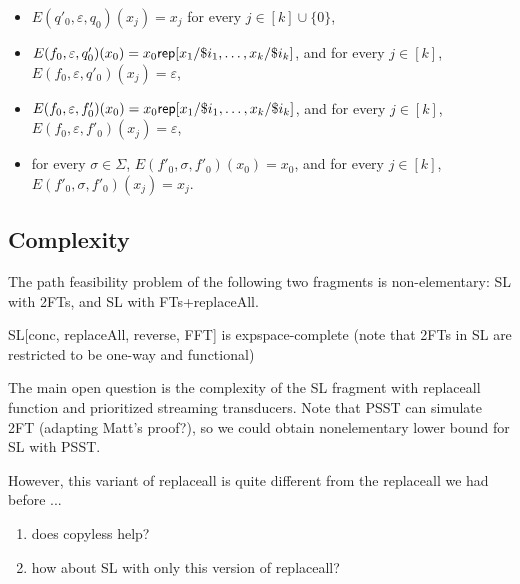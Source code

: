\begin{itemize}
\begin{itemize}
\item $E(q'_0, \varepsilon, q_0)(x_j) = x_j$ for every $j \in [k] \cup \{0\}$, 
%
\item $E(f_0, \varepsilon, q'_0)(x_0) = x_0 \mathsf{rep}[x_1/\$i_1,\ldots, x_k/\$i_k]$, and for every $j \in [k]$, $E(f_0, \varepsilon, q'_0)(x_j) = \varepsilon$, 
%
\item $E(f_0, \varepsilon, f'_0)(x_0) = x_0  \mathsf{rep}[x_1/\$i_1,\ldots, x_k/\$i_k]$, and for every $j \in [k]$, $E(f_0, \varepsilon, f'_0)(x_j) = \varepsilon$,
%
\item for every $\sigma \in \Sigma$, $E(f'_0, \sigma, f'_0)(x_0) = x_0$, and  for every $j \in [k]$, $E(f'_0, \sigma, f'_0)(x_j) = x_j$.
\end{itemize}
%
\end{itemize}


\subsection{Complexity}

\begin{proposition}[POPL'19]
	The path feasibility problem of the following two fragments is non-elementary: SL with 2FTs, and SL with FTs+replaceAll.
	
	SL[conc, replaceAll, reverse, FFT] is expspace-complete (note that 2FTs in SL are restricted to be one-way and functional)
\end{proposition}



The main open question is the complexity of the SL fragment with replaceall function and prioritized streaming transducers. Note that PSST can simulate 2FT (adapting Matt's proof?), so we could obtain nonelementary lower bound for SL with PSST.

However, this variant of replaceall is quite different from the replaceall we had before ...

\begin{enumerate}
\item  does  copyless help?
\item how about SL with only this version of replaceall?
\end{enumerate}
